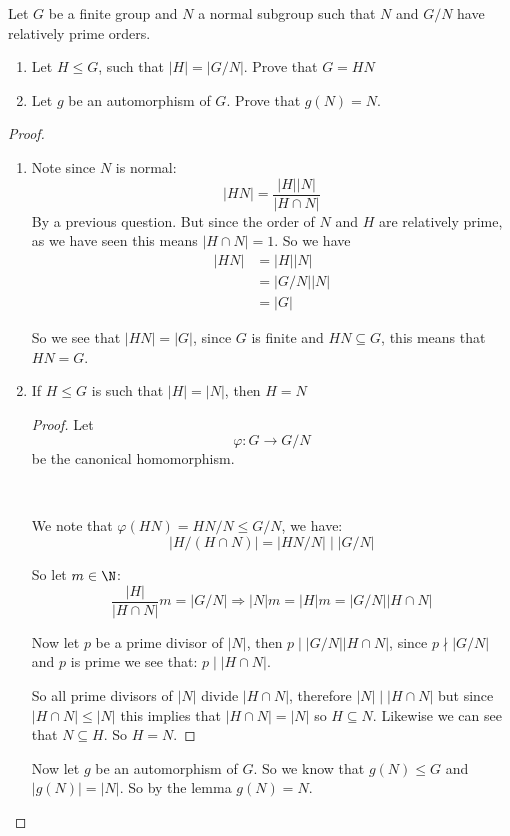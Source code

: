 \begin{exercise}
Let $G$ be a finite group and $N$ a normal subgroup such that $N$ and $G/N$ have relatively prime orders.
\begin{enumerate}[label = (\alph*)]
\item Let $H\leq G$, such that $|H| = |G/N|$. Prove that $G = HN$
\item Let $g$ be an automorphism of $G$. Prove that $g(N) = N$.
\end{enumerate}
\begin{proof}
\begin{enumerate}[label = (\alph*)]
\item  Note since $N$ is normal:\[|HN| = \frac{|H||N|}{|H\cap N|}\] By a previous question. But since the order of $N$ and $H$ are relatively prime, as we have seen this means $|H\cap N| = 1$.
So we have \begin{align*}
|HN| &= |H||N|\\
&= |G/N||N|\\
&= |G|
\end{align*}

So we see that $|HN| = |G|$, since $G$ is finite and $HN\subseteq G$, this means that $HN = G$.

\item \begin{lemma}
If $H\leq G$ is such that $|H| = |N|$, then $H = N$
\begin{proof}
Let \[\varphi\colon G\rightarrow G/N\] be the canonical homomorphism.

\

We note that $\varphi(HN) = HN/N\leq G/N$, we have:\begin{equation}
|H/(H\cap N)| = |HN/N| \mid |G/N|
\end{equation}

So let $m\in \N$:\[
\frac{|H|}{|H\cap N|}m = |G/N| \Rightarrow |N|m = |H|m = |G/N||H\cap N|
\]

Now let $p$ be a prime divisor of $|N|$, then $p\mid |G/N||H\cap N|$, since $p\nmid |G/N|$ and $p$ is prime we see that: $p\mid |H\cap N|$.

So all prime divisors of $|N|$ divide $|H\cap N|$, therefore $|N|\mid |H\cap N|$ but since $|H\cap N|\leq |N|$ this implies that $|H\cap N| = |N|$ so $H\subseteq N$. Likewise we can see that $N\subseteq H$. So $H = N$.
\end{proof}
\end{lemma}

Now let $g$ be an automorphism of $G$. So we know that $g(N)\leq G$ and $|g(N)| = |N|$. So by the lemma $g(N) = N$. 
\end{enumerate}
\end{proof}
\end{exercise}
